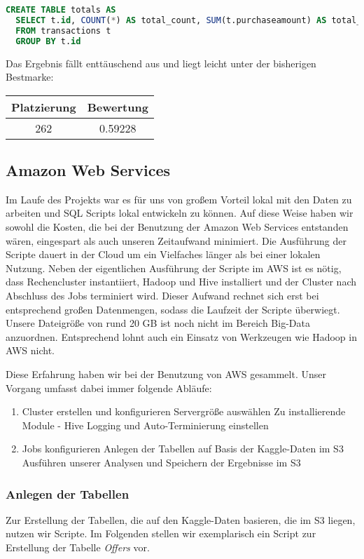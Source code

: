 \begin{lstlisting}[language=SQL]
CREATE TABLE totals AS
  SELECT t.id, COUNT(*) AS total_count, SUM(t.purchaseamount) AS total_spent
  FROM transactions t
  GROUP BY t.id
\end{lstlisting}

Das Ergebnis fällt enttäuschend aus und liegt leicht unter der bisherigen Bestmarke:
\begin{tabular}{|c|c|}
	\hline \textbf{Platzierung} & \textbf{Bewertung} \\ 
	\hline 262 & 0.59228  \\ 
	\hline 
\end{tabular}
	
\subsection{Amazon Web Services}
Im Laufe des Projekts war es für uns von großem Vorteil lokal mit den Daten zu arbeiten und SQL Scripts lokal entwickeln zu können. Auf diese Weise haben wir sowohl die Kosten, die bei der Benutzung der Amazon Web Services entstanden wären, eingespart als auch unseren Zeitaufwand minimiert. Die Ausführung der Scripte dauert in der Cloud um ein Vielfaches länger als bei einer lokalen Nutzung. Neben der eigentlichen Ausführung der Scripte im AWS ist es nötig, dass Rechencluster instantiiert, Hadoop und Hive installiert und der Cluster nach Abschluss des Jobs terminiert wird. Dieser Aufwand rechnet sich erst bei entsprechend großen Datenmengen, sodass die Laufzeit der Scripte überwiegt. Unsere Dateigröße von rund 20 GB ist noch nicht im Bereich Big-Data anzuordnen. Entsprechend lohnt auch ein Einsatz von Werkzeugen wie Hadoop in AWS nicht.

Diese Erfahrung haben wir bei der Benutzung von AWS gesammelt. Unser Vorgang umfasst dabei immer folgende Abläufe:
\begin{enumerate}
\item Cluster erstellen und konfigurieren
\subitem Servergröße auswählen
\subitem Zu installierende Module - Hive
\subitem Logging und Auto-Terminierung einstellen
\item Jobs konfigurieren
\subitem Anlegen der Tabellen auf Basis der Kaggle-Daten im S3
\subitem Ausführen unserer Analysen und Speichern der Ergebnisse im S3
\end{enumerate}

\subsubsection{Anlegen der Tabellen}
Zur Erstellung der Tabellen, die auf den Kaggle-Daten basieren, die im S3 liegen, nutzen wir Scripte. Im Folgenden stellen wir exemplarisch ein Script zur Erstellung der Tabelle \textit{Offers} vor. 

